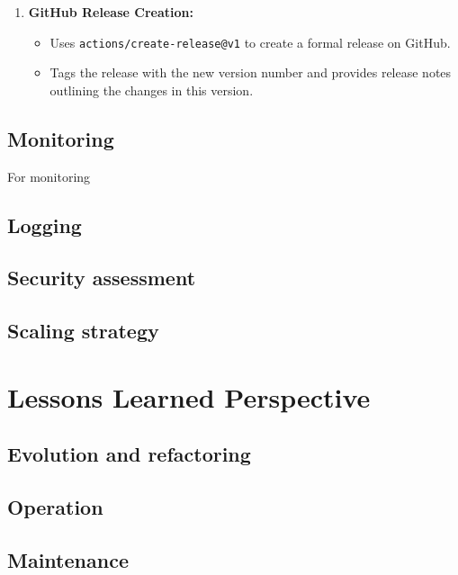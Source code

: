 \documentclass[12pt, a4paper, oneside]{book}
\begin{document}
\begin{spacing}{1.5}
\begin{enumerate}
    \item \textbf{GitHub Release Creation:}
    \begin{itemize}
        \item Uses \texttt{actions/create-release@v1} to create a formal release on GitHub.
        \item Tags the release with the new version number and provides release notes outlining the changes in this version.
    \end{itemize}
\end{enumerate}



\section{Monitoring}
For monitoring 

\section{Logging}

\section{Security assessment}

\section{Scaling strategy}

\chapter{Lessons Learned Perspective}

\section{Evolution and refactoring}

\section{Operation}

\section{Maintenance}



\end{spacing}
\end{document}
